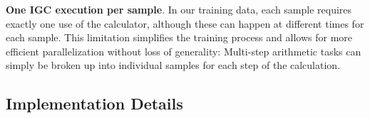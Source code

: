\documentclass[11pt]{article}
\begin{document}
\textbf{One IGC execution per sample}.
In our training data, each sample requires exactly one use of the calculator, although these can happen at different times for each sample.
This limitation simplifies the training process and allows for more efficient parallelization without loss of generality: Multi-step arithmetic tasks can simply be broken up into individual samples for each step of the calculation.



\subsection{Implementation Details}
\end{document}
